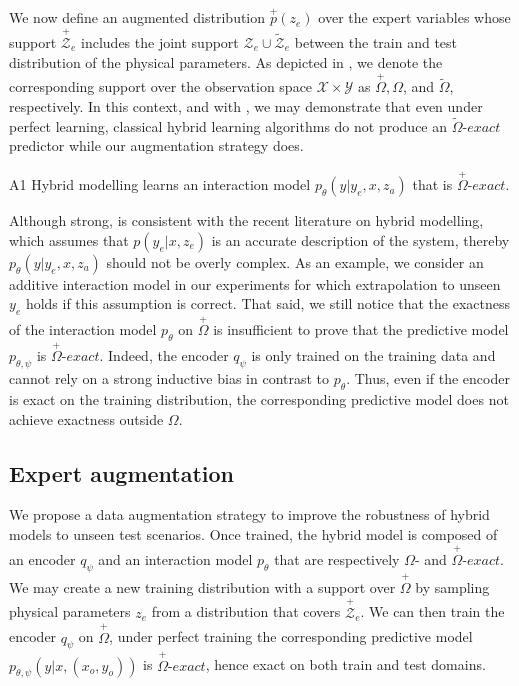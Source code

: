 We now define an augmented distribution $\overset{+}{p}(z_e)$ over the expert variables whose support $\overset{+}{\mathcal{Z}}_e$ includes the joint support $\mathcal{Z}_e \cup \tilde{\mathcal{Z}}_e$ between the train and test distribution of the physical parameters. As depicted in , we denote the corresponding support over the observation space $\mathcal{X} \times \mathcal{Y}$ as $\overset{+}{\Omega}, \Omega$, and $\tilde{\Omega}$, respectively. In this context, and with \textbf{}, we may demonstrate that even under perfect learning, classical hybrid learning algorithms do not produce an $\tilde{\Omega}\textit{-exact}$ predictor while our augmentation strategy does.
\begin{assumption}{A1}{} \label{hyp:first}
Hybrid modelling learns an interaction model $p_\theta(y|y_e, x, z_a)$ that is $\overset{+}{\Omega}\textit{-exact}$.
\end{assumption}
Although strong, \textbf{} is consistent with the recent literature on hybrid modelling, which assumes that $p(y_e|x, z_e)$ is an accurate description of the system, thereby $p_\theta(y|y_e, x, z_a)$ should not be overly complex. As an example, we consider an additive interaction model in our experiments for which extrapolation to unseen $y_e$ holds if this assumption is correct. That said, we still notice that the exactness of the interaction model $p_\theta$ on $\overset{+}{\Omega}$ is insufficient to prove that the predictive model $p_{\theta, \psi}$ is $\overset{+}{\Omega}\textit{-exact}$. Indeed, the encoder $q_\psi$ is only trained on the training data and cannot rely on a strong inductive bias in contrast to $p_\theta$. Thus, even if the encoder is exact on the training distribution, the corresponding predictive model does not achieve exactness outside $\Omega$.

\subsection{Expert augmentation}
We propose a data augmentation strategy to improve the robustness of hybrid models to unseen test scenarios. Once trained, the hybrid model is composed of an encoder $q_\psi$ and an interaction model $p_\theta$ that are respectively $\Omega\textit{-}$ and $\overset{+}{\Omega}\textit{-exact}$. We may create a new training distribution with a support over $\overset{+}{\Omega}$ by sampling physical parameters $z_e$ from a distribution that covers $\overset{+}{\mathcal{Z}}_e$. We can then train the encoder $q_\psi$ on $\overset{+}{\Omega}$, under perfect training the corresponding predictive model $p_{\theta, \psi}(y|x, (x_o, y_o))$ is $\overset{+}{\Omega}\textit{-exact}$, hence exact on both train and test domains.

